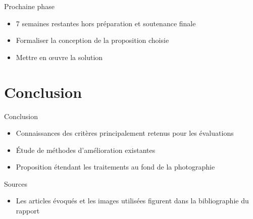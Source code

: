 \documentclass{beamer}
\begin{document}
\begin{frame}{Prochaine phase}
\begin{itemize}
\item 7 semaines restantes hors préparation et soutenance finale
\item Formaliser la conception de la proposition choisie
\item Mettre en œuvre la solution
\end{itemize}
\end{frame}

\section{Conclusion}
\begin{frame}{Conclusion}
\begin{itemize}
\item Connaissances des critères principalement retenus pour les évaluations
\item Étude de méthodes d'amélioration existantes
\item Proposition étendant les traitements au fond de la photographie 
\end{itemize}
\end{frame}

\begin{frame}{Sources}
\begin{itemize}
\item Les articles évoqués et les images utilisées figurent dans la bibliographie du rapport 
\end{itemize}
\end{frame}
\end{document}
